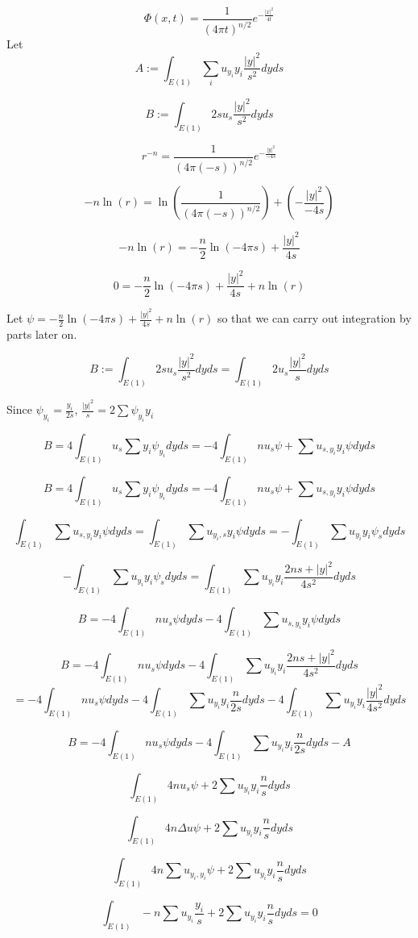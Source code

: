 \documentclass{article}
\begin{document}
$$\Phi(x,t) = \frac{1}{(4\pi t)^{n/2}} e^{-\frac{|x|^2}{4t}}$$
Let $$A:= \int_{E(1)} \sum_{i} u_{y_i} y_i \frac{ |y|^2}{s^2}dy  ds$$

$$B:= \int_{E(1)} 2s u_s \frac{ |y|^2}{s^2} dy  ds$$

$$r^{-n} = \frac{1}{(4\pi (-s))^{n/2}} e^{-\frac{|y|^2}{-4s}} $$

$$-n \ln(r) = \ln(\frac{1}{(4\pi (-s))^{n/2}} ) + (-\frac{|y|^2}{-4s})$$

$$-n \ln(r) = -\frac{n}{2}\ln({-4\pi s} ) + \frac{|y|^2}{4s}$$

$$ 0= -\frac{n}{2}\ln({-4\pi s} ) + \frac{|y|^2}{4s}+n \ln(r)$$

Let $\psi = -\frac{n}{2}\ln({-4\pi s} ) + \frac{|y|^2}{4s}+n \ln(r)$ so that we can carry out integration by parts later on.

$$B:= \int_{E(1)} 2s u_s \frac{ |y|^2}{s^2} dy  ds = \int_{E(1)} 2 u_s \frac{ |y|^2}{s} dy  ds$$

Since $\psi_{y_i} = \frac{y_i}{2s}$, $\frac{ |y|^2}{s} = 2\sum \psi_{y_i} y_i$

$$B=  4 \int_{E(1)}  u_s \sum y_i \psi_{y_i}  dy  ds = -4 \int_{E(1)}  n u_s \psi +\sum u_{s,y_i} y_i  \psi  dy  ds $$ 

$$B=  4 \int_{E(1)}  u_s \sum y_i \psi_{y_i}  dy  ds = -4 \int_{E(1)}  n u_s \psi +\sum u_{s,y_i} y_i  \psi  dy  ds $$ 

$$\int_{E(1)} \sum u_{s,y_i} y_i  \psi  dy  ds = \int_{E(1)} \sum u_{y_i,s} y_i  \psi  dy  ds = -\int_{E(1)} \sum u_{y_i} y_i  \psi_s  dy  ds$$

$$-\int_{E(1)} \sum u_{y_i} y_i  \psi_s  dy  ds = \int_{E(1)} \sum u_{y_i} y_i   \frac{2ns+|y|^2}{4s^2}  dy  ds $$

$$B  = -4 \int_{E(1)}  n u_s \psi dy ds -4 \int_{E(1)} \sum u_{s,y_i} y_i  \psi  dy  ds$$

$$B= -4 \int_{E(1)}  n u_s \psi dy ds -4 \int_{E(1)} \sum u_{y_i} y_i   \frac{2ns+|y|^2}{4s^2}  dy  ds $$
$$=  -4 \int_{E(1)}  n u_s \psi dy ds -4 \int_{E(1)} \sum u_{y_i} y_i  \frac{n}{2s}  dy  ds - 4 \int_{E(1)} \sum u_{y_i} y_i\frac{|y|^2}{4s^2}  dy  ds $$

$$B = -4 \int_{E(1)}  n u_s \psi dy ds -4 \int_{E(1)} \sum u_{y_i} y_i  \frac{n}{2s}  dy  ds - A$$

$$\int_{E(1)}  4 n u_s \psi  + 2  \sum u_{y_i} y_i  \frac{n}{s}  dy  ds$$

$$\int_{E(1)}  4 n \Delta u \psi  + 2  \sum u_{y_i} y_i  \frac{n}{s}  dy  ds$$

$$\int_{E(1)}  4 n \sum u_{y_i,y_i} \psi  + 2  \sum u_{y_i} y_i  \frac{n}{s}  dy  
ds$$

$$\int_{E(1)}  -n \sum u_{y_i} \frac{y_i}{s}  + 2  \sum u_{y_i} y_i  \frac{n}{s}  dy  ds = 0$$
\end{document}
